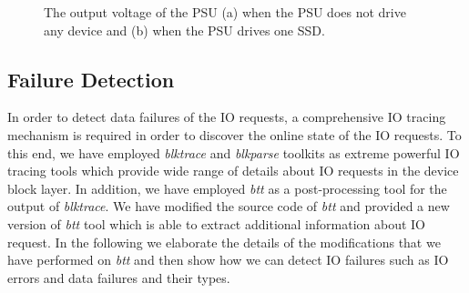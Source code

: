 \begin{figure}[!t]
	\centering
	\hfil
	\hspace{-.8pt}
	
	\vspace{-0.5em}
	\caption{The output voltage of the PSU (a) when the PSU does not drive any device and (b) when the PSU drives one SSD.}
	\vspace{-2em}
	\label{fig:fall}
\end{figure}

\vspace{-1em}
\subsection{Failure Detection}
\vspace{-0.7em}
\label{sec:failure_detection}
In order to detect data failures of the IO requests, a comprehensive IO tracing mechanism is required in order to discover the online state of the IO requests. To this end, we have employed \emph{blktrace} and \emph{blkparse} toolkits as extreme powerful IO tracing tools which provide wide range of details about IO requests in the device block layer. In addition, we have employed \emph{btt} as a post-processing tool for the output of \emph{blktrace}. We have modified the source code of \emph{btt} and provided a new version of \emph{btt} tool which is able to extract additional information about IO request. In the following we elaborate the details of the modifications that we have performed on \emph{btt} and then show how we can detect IO failures such as IO errors and data failures and their types.

